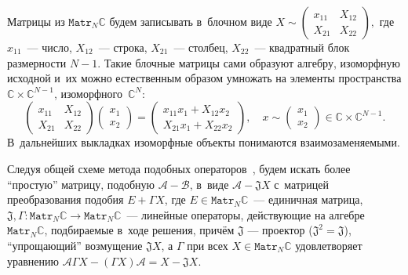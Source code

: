 Матрицы из \( \mathtt{Matr}_N\mathbb{C} \) будем записывать в~блочном виде
\( X \sim
    \begin{pmatrix}
    x_{11} & X_{12} \\
    X_{21} & X_{22}
    \end{pmatrix}, \)
    где \( x_{11} \)~--- число,
    \( X_{12} \)~--- строка, \( X_{21} \)~--- столбец,
    \( X_{22} \)~--- квадратный блок размерности \( N-1 \).
Такие блочные матрицы сами образуют алгебру, изоморфную исходной
и~их можно естественным образом умножать
на элементы пространства \( \mathbb{C}\times\mathbb{C}^{N-1} \),
изоморфного~\( \mathbb{C}^N \):
\[
    \begin{pmatrix}
    x_{11} & X_{12} \\
    X_{21} & X_{22}
    \end{pmatrix}
    \begin{pmatrix} x_1 \\ x_2 \end{pmatrix}
  = \begin{pmatrix}
      x_{11} x_1 + X_{12} x_2 \\
      X_{21} x_1 + X_{22} x_2
      \end{pmatrix},\quad x \sim \begin{pmatrix} x_1 \\ x_2 \end{pmatrix}\in \mathbb{C}\times\mathbb{C}^{N-1}.
    \]
В~дальнейших выкладках изоморфные объекты понимаются взаимозаменяемыми.

Следуя общей схеме метода подобных операторов~\cite{baskakov-harmonic,baskakov1983},
будем искать более ``простую'' матрицу, подобную \( \mathcal{A} - \mathcal{B} \),
в~виде \( \mathcal{A} - \mathfrak{J} X \)
с~матрицей преобразования подобия \( E + \Gamma X \),
где \( E\in{\mathtt{Matr}_N\mathbb{C}} \)~--- единичная матрица,
\( \mathfrak{J},\Gamma : \mathtt{Matr}_N\mathbb{C}\to\mathtt{Matr}_N\mathbb{C} \)~--- линейные операторы,
действующие на алгебре \( \mathtt{Matr}_N\mathbb{C} \), подбираемые
в~ходе решения,
      прич\"ем \( \mathfrak{J} \) --- проектор (\(\mathfrak{J}^2=\mathfrak{J}\)),
      ``упрощающий'' возмущение \( \mathfrak{J}X \),
      а \( \Gamma \)
      при всех \( X\in {\mathtt{Matr}_N\mathbb{C}} \)
      удовлетворяет уравнению
          \( \mathcal{A}\Gamma X - (\Gamma X) \mathcal{A} = X - \mathfrak{J}X. \)

